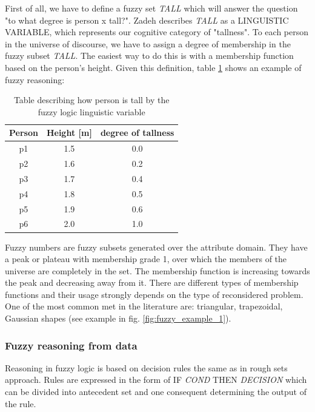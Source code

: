 First of all, we have to define a fuzzy set \textit{TALL} which will answer the question 
"to what degree is person x tall?". Zadeh describes \textit{TALL} as a LINGUISTIC VARIABLE, 
which represents our cognitive category of "tallness". To each person in the universe of discourse, 
we have to assign a degree of membership in the fuzzy subset \textit{TALL}. The easiest way to do this
is with a membership function based on the person's height. Given this
definition, table \ref{tab:fuzzy_logic_example} shows an example of fuzzy
reasoning:
\begin{table}[H]
    \centering
    \caption{Table describing how person is tall by the fuzzy logic linguistic
    variable}
    \begin{tabular}{|c|c|c|}
        \hline
        Person & Height [m] & degree of tallness \\ \hline \hline
        p1 & 1.5 & 0.0 \\ \hline
        p2 & 1.6 & 0.2 \\ \hline
        p3 & 1.7 & 0.4 \\ \hline
        p4 & 1.8 & 0.5 \\ \hline
        p5 & 1.9 & 0.6 \\ \hline
        p6 & 2.0 & 1.0 \\ \hline
    \end{tabular}
    \label{tab:fuzzy_logic_example}
\end{table}

Fuzzy numbers are fuzzy subsets generated over the attribute domain. 
They have a peak or plateau with membership grade 1, over which the 
members of the universe are completely in the set.  The membership 
function is increasing towards the peak and decreasing away from it. 
There are different types of membership functions and their usage 
strongly depends on the type of reconsidered problem. One of the most 
common met in the literature are: triangular, trapezoidal, Gaussian shapes
(see example in fig. \ref{fig:fuzzy_example_1}).

\subsubsection{Fuzzy reasoning from data}
Reasoning in fuzzy logic is based on decision rules the same as in rough sets approach. 
Rules are expressed in the form of IF \textit{COND} THEN \textit{DECISION} 
which can be divided into antecedent set and one consequent determining the
output of the rule. 

